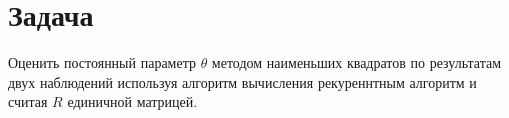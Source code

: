  \section{Задача}
 Оценить постоянный параметр $\theta$ методом наименьших квадратов по результатам двух наблюдений
 используя алгоритм вычисления рекуреннтным алгоритм и считая $R$ единичной матрицей.
 \clearpage